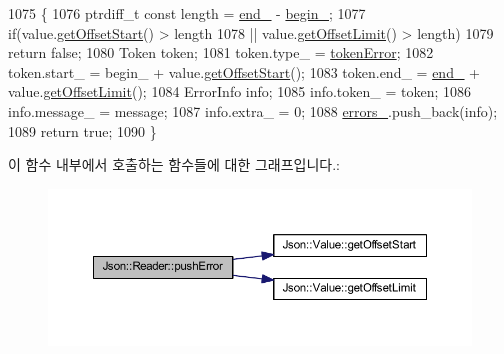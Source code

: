 \begin{DoxyCode}
1075                                                                         \{
1076   ptrdiff\_t \textcolor{keyword}{const} length = \hyperlink{class_json_1_1_reader_a714793579cbf4ee7c5a7223d2c8d77c1}{end\_} - \hyperlink{class_json_1_1_reader_a327166839022ea91f0a8290960a8af76}{begin\_};
1077   \textcolor{keywordflow}{if}(value.\hyperlink{class_json_1_1_value_afa081dc764000951a1d8d6148155508e}{getOffsetStart}() > length
1078     || value.\hyperlink{class_json_1_1_value_a2cdfa01935f87fcace90d450cbd2c0a4}{getOffsetLimit}() > length)
1079     \textcolor{keywordflow}{return} \textcolor{keyword}{false};
1080   Token token;
1081   token.type\_ = \hyperlink{class_json_1_1_reader_aa35e6ab574dc399a0a645ad98ed66bc9a55d1ab9135c3d068b57fafdbabfa569a}{tokenError};
1082   token.start\_ = begin\_ + value.\hyperlink{class_json_1_1_value_afa081dc764000951a1d8d6148155508e}{getOffsetStart}();
1083   token.end\_ = \hyperlink{class_json_1_1_reader_a714793579cbf4ee7c5a7223d2c8d77c1}{end\_} + value.\hyperlink{class_json_1_1_value_a2cdfa01935f87fcace90d450cbd2c0a4}{getOffsetLimit}();
1084   ErrorInfo info;
1085   info.token\_ = token;
1086   info.message\_ = message;
1087   info.extra\_ = 0;
1088   \hyperlink{class_json_1_1_reader_a1bbce45dc4df753bed60c129f4b5147c}{errors\_}.push\_back(info);
1089   \textcolor{keywordflow}{return} \textcolor{keyword}{true};
1090 \}
\end{DoxyCode}
이 함수 내부에서 호출하는 함수들에 대한 그래프입니다.\+:\nopagebreak
\begin{figure}[H]
\begin{center}
\leavevmode
\includegraphics[width=350pt]{class_json_1_1_reader_af5fa7099083f01706635ade1d0f8ddb5_cgraph}
\end{center}
\end{figure}
\mbox{\label{class_json_1_1_reader_a3568be9db568ff57bd3fcc373143dff3}} 
